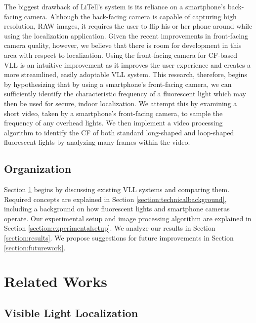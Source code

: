 \documentclass[conference]{IEEEtran}
\begin{document}
The biggest drawback of LiTell's system is its reliance on a smartphone's back-facing camera. Although the back-facing camera is capable of capturing high resolution, RAW images, it requires the user to flip his or her phone around while using the localization application. Given the recent improvements in front-facing camera quality, however, we believe that there is room for development in this area with respect to localization. Using the front-facing camera for CF-based VLL is an intuitive improvement as it improves the user experience and creates a more streamlined, easily adoptable VLL system. This research, therefore, begins by hypothesizing that by using a smartphone's front-facing camera, we can sufficiently identify the characteristic frequency of a fluorescent light which may then be used for secure, indoor localization. We attempt this by examining a short video, taken by a smartphone's front-facing camera, to sample the frequency of any overhead lights. We then implement a video processing algorithm to identify the CF of both standard long-shaped and loop-shaped fluorescent lights by analyzing many frames within the video.

\subsection{Organization}

Section \ref{section:relatedworks} begins by discussing existing VLL systems and comparing them. Required concepts are explained in Section \ref{section:technicalbackground}, including a background on how fluorescent lights and smartphone cameras operate. Our experimental setup and image processing algorithm are explained in Section \ref{section:experimentalsetup}. We analyze our results in Section \ref{section:results}. We propose suggestions for future improvements in Section \ref{section:futurework}.

\section{Related Works}\label{section:relatedworks}

\subsection{Visible Light Localization}
\end{document}

